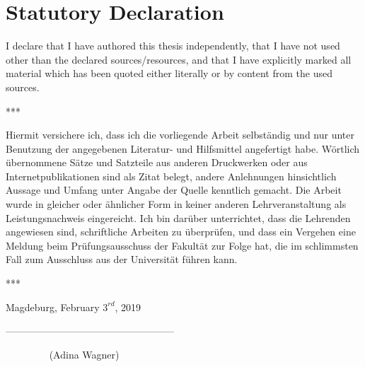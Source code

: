 \documentclass[a4paper, 12pt]{scrreprt}
\begin{document}





\chapter*{Statutory Declaration}

I declare that I have authored this thesis independently, that I have not used
other than the declared sources/resources, and that I have explicitly marked
all material which has been quoted either literally or by content from the
used sources.

\bigskip

\begin{center}
	***
\end{center}

\bigskip

Hiermit versichere ich, dass ich die vorliegende Arbeit selbständig und nur
unter Benutzung der angegebenen Literatur- und Hilfsmittel angefertigt
habe. Wörtlich übernommene Sätze und Satzteile aus anderen Druckwerken
oder aus Internetpublikationen sind als Zitat belegt, andere Anlehnungen
hinsichtlich Aussage und Umfang unter Angabe der Quelle kenntlich gemacht.
Die Arbeit wurde in gleicher oder ähnlicher Form in keiner anderen
Lehrveranstaltung als Leistungsnachweis eingereicht.
Ich bin darüber unterrichtet, dass die Lehrenden angewiesen sind, schriftliche
 Arbeiten zu überprüfen, und dass ein Vergehen eine Meldung beim
Prüfungsausschuss der Fakultät zur Folge hat, die im schlimmsten Fall zum
Ausschluss aus der Universität führen kann.

\bigskip

\begin{center}
	***
\end{center}

\bigskip

Magdeburg, February $3^{rd}$, 2019

\bigskip

\bigskip

\bigskip

---------------------------------------------------

$\phantom{mmmm..}$  (Adina Wagner)
\end{document}
